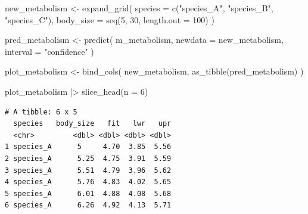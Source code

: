 \documentclass[
  letterpaper,
  8pt,
  a4paper]{book}
\newenvironment{Shaded}{\begin{snugshade}}{\end{snugshade}}
\newcommand{\AttributeTok}[1]{\textcolor[rgb]{0.40,0.45,0.13}{#1}}
\newcommand{\DecValTok}[1]{\textcolor[rgb]{0.68,0.00,0.00}{#1}}
\newcommand{\FunctionTok}[1]{\textcolor[rgb]{0.28,0.35,0.67}{#1}}
\newcommand{\NormalTok}[1]{\textcolor[rgb]{0.00,0.23,0.31}{#1}}
\newcommand{\OtherTok}[1]{\textcolor[rgb]{0.00,0.23,0.31}{#1}}
\newcommand{\SpecialCharTok}[1]{\textcolor[rgb]{0.37,0.37,0.37}{#1}}
\newcommand{\StringTok}[1]{\textcolor[rgb]{0.13,0.47,0.30}{#1}}
\begin{document}
\begin{Shaded}
\begin{Highlighting}[]
\NormalTok{new\_metabolism }\OtherTok{\textless{}{-}} \FunctionTok{expand\_grid}\NormalTok{(}
  \AttributeTok{species =} \FunctionTok{c}\NormalTok{(}\StringTok{"species\_A"}\NormalTok{, }\StringTok{"species\_B"}\NormalTok{, }\StringTok{"species\_C"}\NormalTok{),}
  \AttributeTok{body\_size =} \FunctionTok{seq}\NormalTok{(}\DecValTok{5}\NormalTok{, }\DecValTok{30}\NormalTok{, }\AttributeTok{length.out =} \DecValTok{100}\NormalTok{)}
\NormalTok{)}

\NormalTok{pred\_metabolism }\OtherTok{\textless{}{-}} \FunctionTok{predict}\NormalTok{(}
\NormalTok{  m\_metabolism,}
  \AttributeTok{newdata =}\NormalTok{ new\_metabolism,}
  \AttributeTok{interval =} \StringTok{"confidence"}
\NormalTok{)}

\NormalTok{plot\_metabolism }\OtherTok{\textless{}{-}} \FunctionTok{bind\_cols}\NormalTok{(}
\NormalTok{  new\_metabolism,}
  \FunctionTok{as\_tibble}\NormalTok{(pred\_metabolism)}
\NormalTok{)}

\NormalTok{plot\_metabolism }\SpecialCharTok{|\textgreater{}} 
  \FunctionTok{slice\_head}\NormalTok{(}\AttributeTok{n =} \DecValTok{6}\NormalTok{)}
\end{Highlighting}
\end{Shaded}

\begin{verbatim}
# A tibble: 6 x 5
  species   body_size   fit   lwr   upr
  <chr>         <dbl> <dbl> <dbl> <dbl>
1 species_A      5     4.70  3.85  5.56
2 species_A      5.25  4.75  3.91  5.59
3 species_A      5.51  4.79  3.96  5.62
4 species_A      5.76  4.83  4.02  5.65
5 species_A      6.01  4.88  4.08  5.68
6 species_A      6.26  4.92  4.13  5.71
\end{verbatim}
\end{document}
